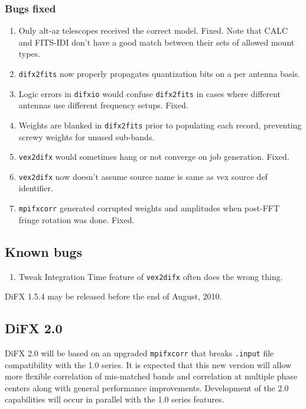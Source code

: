\subsubsection{Bugs fixed}

\begin{enumerate}
\item Only alt-az telescopes received the correct model.  Fixed.  Note that CALC and FITS-IDI don't have a good match between their sets of allowed mount types.
\item {\tt difx2fits} now properly propagates quantization bits on a per antenna basis.
\item Logic errors in {\tt difxio} would confuse {\tt difx2fits} in cases where different antennas use different frequency setups.  Fixed.
\item Weights are blanked in {\tt difx2fits} prior to populating each record, preventing screwy weights for unused sub-bands.
\item {\tt vex2difx} would sometimes hang or not converge on job generation.  Fixed.
\item {\tt vex2difx} now doesn't assume source name is same as vex source def identifier.
\item {\tt mpifxcorr} generated corrupted weights and amplitudes when post-FFT fringe rotation was done.  Fixed.
\end{enumerate}

\subsection{Known bugs}

\begin{enumerate}
\item Tweak Integration Time feature of {\tt vex2difx} often does the wrong thing.
\end{enumerate}

DiFX 1.5.4 may be released before the end of August, 2010.

\subsection{DiFX 2.0}

DiFX 2.0 will be based on an upgraded {\tt mpifxcorr} that breaks {\tt .input} file compatibility with the 1.0 series.
It is expected that this new version will allow more flexible correlation of mis-matched bands and correlation at multiple phase centers along with general performance improvements.
Development of the 2.0 capabilities will occur in parallel with the 1.0 series features.

